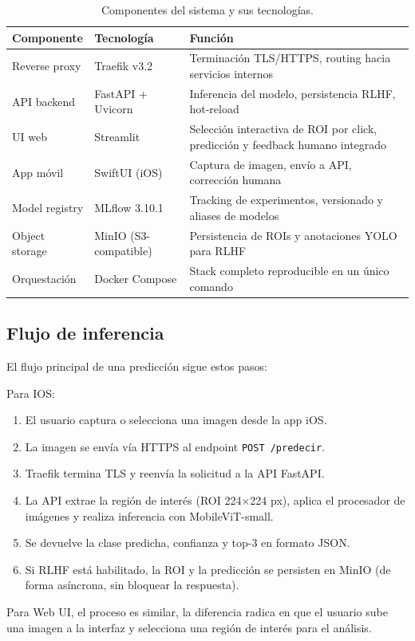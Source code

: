 \documentclass[12pt,a4paper]{article}
\begin{document}
\begin{table}[H]
  \centering
  \renewcommand{\arraystretch}{1.3}
  \begin{tabular}{p{3.2cm} p{3.8cm} p{6.5cm}}
    \toprule
    \textbf{Componente} & \textbf{Tecnología} & \textbf{Función} \\
    \midrule
    \rowcolor{rowgray}
    Reverse proxy   & Traefik v3.2           & Terminación TLS/HTTPS, routing hacia servicios internos \\
    API backend     & FastAPI + Uvicorn       & Inferencia del modelo, persistencia RLHF, hot-reload \\
    \rowcolor{rowgray}
    UI web          & Streamlit              & Selección interactiva de ROI por click, predicción y feedback humano integrado \\
    App móvil       & SwiftUI (iOS)          & Captura de imagen, envío a API, corrección humana \\
    \rowcolor{rowgray}
    Model registry  & MLflow 3.10.1          & Tracking de experimentos, versionado y aliases de modelos \\
    Object storage  & MinIO (S3-compatible)  & Persistencia de ROIs y anotaciones YOLO para RLHF \\
    \rowcolor{rowgray}
    Orquestación    & Docker Compose         & Stack completo reproducible en un único comando \\
    \bottomrule
  \end{tabular}
  \caption{Componentes del sistema y sus tecnologías.}
\end{table}

\subsection{Flujo de inferencia}

El flujo principal de una predicción sigue estos pasos:

Para IOS:
\begin{enumerate}
  \item El usuario captura o selecciona una imagen desde la app iOS.
  \item La imagen se envía vía HTTPS al endpoint \texttt{POST /predecir}.
  \item Traefik termina TLS y reenvía la solicitud a la API FastAPI.
  \item La API extrae la región de interés (ROI 224$\times$224 px), aplica el
        procesador de imágenes y realiza inferencia con MobileViT-small.
  \item Se devuelve la clase predicha, confianza y top-3 en formato JSON.
  \item Si RLHF está habilitado, la ROI y la predicción se persisten en MinIO
        (de forma asíncrona, sin bloquear la respuesta).
\end{enumerate}
Para Web UI, el proceso es similar, la diferencia radica en que el usuario sube una imagen a la interfaz y selecciona una región de interés para el análisis.
\end{document}

